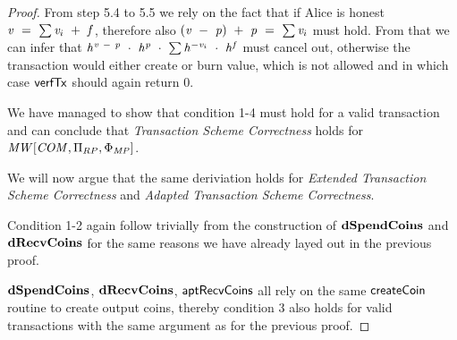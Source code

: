 \begin{proof}
    From step 5.4 to 5.5 we rely on the fact that if Alice is honest $\mathit{v} ~=~ \sum \mathit{v}_i ~+~ \mathit{f}$, therefore also $(\mathit{v} ~-~ \mathit{p}) ~+~ \mathit{p} ~=~ \sum \mathit{v}_i$ must hold.
    From that we can infer that $\mathit{h}^{\mathit{v} ~-~ \mathit{p}} ~\cdot~ \mathit{h}^{\mathit{p}} ~\cdot~ \sum \mathit{h}^{- \mathit{v}_i} ~\cdot~ \mathit{h}^{\mathit{f}}$ must cancel out, otherwise the transaction would either create or burn value, which is not allowed and in which case $\mathsf{verfTx}$ should again return 0.

    We have managed to show that condition 1-4 must hold for a valid transaction and can conclude that \emph{Transaction Scheme Correctness} holds for $\mathit{MW}[\mathit{COM},\Pi_{RP},\Phi_{\mathit{MP}}]$.

    We will now argue that the same deriviation holds for \emph{Extended Transaction Scheme Correctness} and \emph{Adapted Transaction Scheme Correctness}.

    Condition 1-2 again follow trivially from the construction of $\mathbf{dSpendCoins}$ and $\mathbf{dRecvCoins}$ for the same reasons we have already layed out in the previous proof.

    $\mathbf{dSpendCoins}$, $\mathbf{dRecvCoins}$, $\mathsf{aptRecvCoins}$ all rely on the same $\mathsf{createCoin}$ routine to create output coins, thereby condition 3 also holds for valid transactions with the same argument as for the previous proof.


\end{proof}
